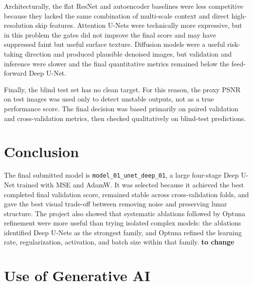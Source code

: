 \documentclass[a4paper,10pt]{article}
\begin{document}
Architecturally, the flat ResNet and autoencoder baselines were less competitive 
because they lacked the same combination of multi-scale context and direct high-resolution 
skip features. Attention U-Nets were technically more expressive, but in this problem 
the gates did not improve the final score and may have suppressed faint but useful 
surface texture. Diffusion models were a useful risk-taking direction and produced 
plausible denoised images, but validation and inference were slower and the final 
quantitative metrics remained below the feed-forward Deep U-Net.

Finally, the blind test set has no clean target. For this reason, the proxy PSNR on 
test images was used only to detect unstable outputs, not as a true performance score. 
The final decision was based primarily on paired validation and cross-validation 
metrics, then checked qualitatively on blind-test predictions.



\section{Conclusion}
The final submitted model is \texttt{model\_01\_unet\_deep\_01}, a large four-stage 
Deep U-Net trained with MSE and AdamW. It was selected because it achieved the best 
completed final validation score, remained stable across cross-validation folds, and 
gave the best visual trade-off between removing noise and preserving lunar structure. 
The project also showed that systematic ablations followed by Optuna refinement were 
more useful than trying isolated complex models: the ablations identified Deep U-Nets 
as the strongest family, and Optuna refined the learning rate, regularization, 
activation, and batch size within that family. \textbf{to change}
\section*{Use of Generative AI}
\end{document}
